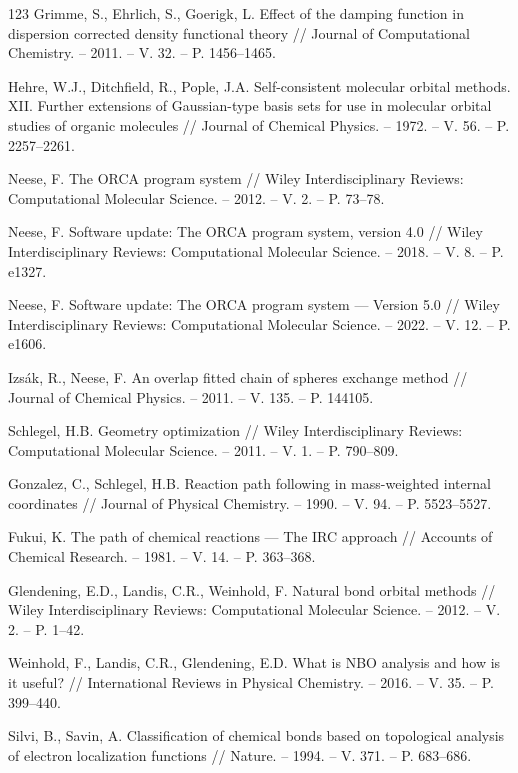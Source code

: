 \documentclass[12pt,a4paper]{report}
\begin{document}
\begin{thebibliography}{123}
 Grimme, S., Ehrlich, S., Goerigk, L. Effect of the damping function in dispersion corrected density functional theory // Journal of Computational Chemistry. – 2011. – V. 32. – P. 1456–1465.

 Hehre, W.J., Ditchfield, R., Pople, J.A. Self-consistent molecular orbital methods. XII. Further extensions of Gaussian-type basis sets for use in molecular orbital studies of organic molecules // Journal of Chemical Physics. – 1972. – V. 56. – P. 2257–2261.

 Neese, F. The ORCA program system // Wiley Interdisciplinary Reviews: Computational Molecular Science. – 2012. – V. 2. – P. 73–78.

 Neese, F. Software update: The ORCA program system, version 4.0 // Wiley Interdisciplinary Reviews: Computational Molecular Science. – 2018. – V. 8. – P. e1327.

 Neese, F. Software update: The ORCA program system — Version 5.0 // Wiley Interdisciplinary Reviews: Computational Molecular Science. – 2022. – V. 12. – P. e1606.

 Izsák, R., Neese, F. An overlap fitted chain of spheres exchange method // Journal of Chemical Physics. – 2011. – V. 135. – P. 144105.

 Schlegel, H.B. Geometry optimization // Wiley Interdisciplinary Reviews: Computational Molecular Science. – 2011. – V. 1. – P. 790–809.

 Gonzalez, C., Schlegel, H.B. Reaction path following in mass-weighted internal coordinates // Journal of Physical Chemistry. – 1990. – V. 94. – P. 5523–5527.

 Fukui, K. The path of chemical reactions — The IRC approach // Accounts of Chemical Research. – 1981. – V. 14. – P. 363–368.

 Glendening, E.D., Landis, C.R., Weinhold, F. Natural bond orbital methods // Wiley Interdisciplinary Reviews: Computational Molecular Science. – 2012. – V. 2. – P. 1–42.

 Weinhold, F., Landis, C.R., Glendening, E.D. What is NBO analysis and how is it useful? // International Reviews in Physical Chemistry. – 2016. – V. 35. – P. 399–440.

 Silvi, B., Savin, A. Classification of chemical bonds based on topological analysis of electron localization functions // Nature. – 1994. – V. 371. – P. 683–686.


\end{thebibliography}
\end{document}
